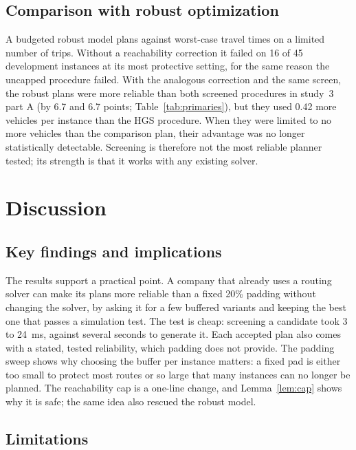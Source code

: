 \documentclass[12pt,letterpaper]{article}
\newcommand{\RobInstances}{45}
\newcommand{\RobNoPlanBoxSix}{16}
\newcommand{\TimeScreenTwenty}{3}
\newcommand{\TimeScreenTwoHundred}{24}
\newcommand{\PaROne}{6.7}
\newcommand{\PaRTwo}{6.7}
\newcommand{\PaRThree}{0.42}
\begin{document}
\subsection{Comparison with robust optimization}

A budgeted robust model plans against worst-case travel times on a limited number
of trips. Without a reachability correction it failed on \RobNoPlanBoxSix{} of
\RobInstances{} development instances at its most protective setting, for the same
reason the uncapped procedure failed. With the analogous correction and the same
screen, the robust plans were more reliable than both screened procedures in
study~3 part A (by \PaROne{} and \PaRTwo{} points; Table~\ref{tab:primaries}), but
they used \PaRThree{} more vehicles per instance than the HGS procedure. When they
were limited to no more vehicles than the comparison plan, their advantage was no
longer statistically detectable. Screening is therefore not the most reliable
planner tested; its strength is that it works with any existing solver.

\section{Discussion}

\subsection{Key findings and implications}

The results support a practical point. A company that already uses a routing solver
can make its plans more reliable than a fixed 20\% padding without changing the
solver, by asking it for a few buffered variants and keeping the best one that
passes a simulation test. The test is cheap: screening a candidate took
\TimeScreenTwenty{} to \TimeScreenTwoHundred{}~ms, against several seconds to
generate it. Each accepted plan also comes with a stated, tested reliability, which
padding does not provide. The padding sweep shows why choosing the buffer per
instance matters: a fixed pad is either too small to protect most routes or so
large that many instances can no longer be planned. The reachability cap is a one-line change, and
Lemma~\ref{lem:cap} shows why it is safe; the same idea also rescued the robust
model.

\subsection{Limitations}
\end{document}
